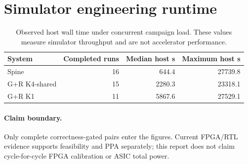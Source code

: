 \documentclass[10pt]{article}
\begin{document}
\section{Simulator engineering runtime}
\begin{table}[ht]
\centering
\begin{tabular}{lrrr}
\toprule
System & Completed runs & Median host s & Maximum host s \\
\midrule
    Spine & 16 & 644.4 & 27739.8 \\
    G+R K4-shared & 15 & 2280.3 & 23318.1 \\
    G+R K1 & 11 & 5867.6 & 27529.1 \\
\bottomrule
\end{tabular}
\caption{Observed host wall time under concurrent campaign load. These values
measure simulator throughput and are not accelerator performance.}
\end{table}

\paragraph{Claim boundary.}
Only complete correctness-gated pairs enter the figures. Current FPGA/RTL
evidence supports feasibility and PPA separately; this report does not claim
cycle-for-cycle FPGA calibration or ASIC total power.
\end{document}
